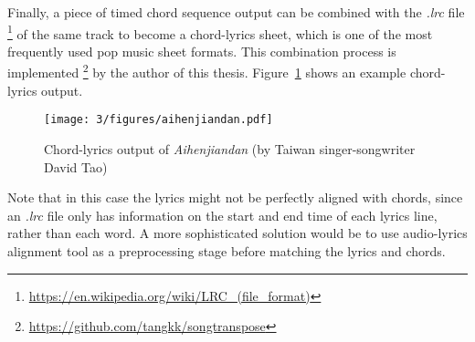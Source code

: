Finally, a piece of timed chord sequence output can be combined with the \textit{.lrc} file \footnote{\url{https://en.wikipedia.org/wiki/LRC\_(file\_format)}} of the same track to become a chord-lyrics sheet, which is one of the most frequently used pop music sheet formats. This combination process is implemented \footnote{\url{https://github.com/tangkk/songtranspose}} by the author of this thesis. Figure~\ref{fig:3-aihenjiandan} shows an example chord-lyrics output.
\begin{figure}[h]
    \centering
        \texttt{[image: 3/figures/aihenjiandan.pdf]}
    \caption{Chord-lyrics output of \textit{Aihenjiandan} (by Taiwan singer-songwriter David Tao)}
    \label{fig:3-aihenjiandan}
\end{figure}
Note that in this case the lyrics might not be perfectly aligned with chords, since an \textit{.lrc} file only has information on the start and end time of each lyrics line, rather than each word. A more sophisticated solution would be to use audio-lyrics alignment tool \cite{mauch2010lyrics} as a preprocessing stage before matching the lyrics and chords.




